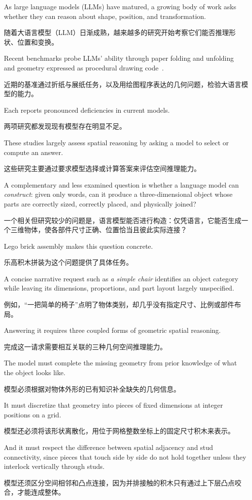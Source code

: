 \documentclass[11pt,letterpaper]{article}
\let\cite\citep
\newcommand{\pair}[2]{\par\addvspace{4pt}\noindent
  \begin{minipage}{\linewidth}\raggedright
  #1\par\nobreak\vspace{1pt}
  {\color{translation}\chinesefont\fontsize{10.5}{15.3}\selectfont #2\par}
  \end{minipage}\par}
\begin{document}
\pair{As large language models (LLMs) have matured, a growing body of work asks whether they can reason about shape, position, and transformation.}{随着大语言模型（LLM）日渐成熟，越来越多的研究开始考察它们能否推理形状、位置和变换。}

\pair{Recent benchmarks probe LLMs' ability through paper folding and unfolding~\cite{zhou2026paperfoldingpuzzle} and geometry expressed as procedural drawing code~\cite{luo2026geogrambench}.}{近期的基准通过折纸与展纸任务，以及用绘图程序表达的几何问题，检验大语言模型的能力。}

\pair{Each reports pronounced deficiencies in current models.}{两项研究都发现现有模型存在明显不足。}

\pair{These studies largely assess spatial reasoning by asking a model to select or compute an answer.}{这些研究主要通过要求模型选择或计算答案来评估空间推理能力。}

\pair{A complementary and less examined question is whether a language model can \emph{construct}: given only words, can it produce a three-dimensional object whose parts are correctly sized, correctly placed, and physically joined?}{一个相关但研究较少的问题是，语言模型能否进行构造：仅凭语言，它能否生成一个三维物体，使各部件尺寸正确、位置恰当且彼此实际连接？}

\pair{Lego brick assembly makes this question concrete.}{乐高积木拼装为这个问题提供了具体任务。}

\pair{A concise narrative request such as \emph{a simple chair} identifies an object category while leaving its dimensions, proportions, and part layout largely unspecified.}{例如，“一把简单的椅子”点明了物体类别，却几乎没有指定尺寸、比例或部件布局。}

\pair{Answering it requires three coupled forms of geometric spatial reasoning.}{完成这一请求需要相互关联的三种几何空间推理能力。}

\pair{The model must complete the missing geometry from prior knowledge of what the object looks like.}{模型必须根据对物体外形的已有知识补全缺失的几何信息。}

\pair{It must discretize that geometry into pieces of fixed dimensions at integer positions on a grid.}{模型还必须将该形状离散化，用位于网格整数坐标上的固定尺寸积木来表示。}

\pair{And it must respect the difference between spatial adjacency and stud connectivity, since pieces that touch side by side do not hold together unless they interlock vertically through studs.}{模型还须区分空间相邻和凸点连接，因为并排接触的积木只有通过上下层凸点咬合，才能连成整体。}
\end{document}
